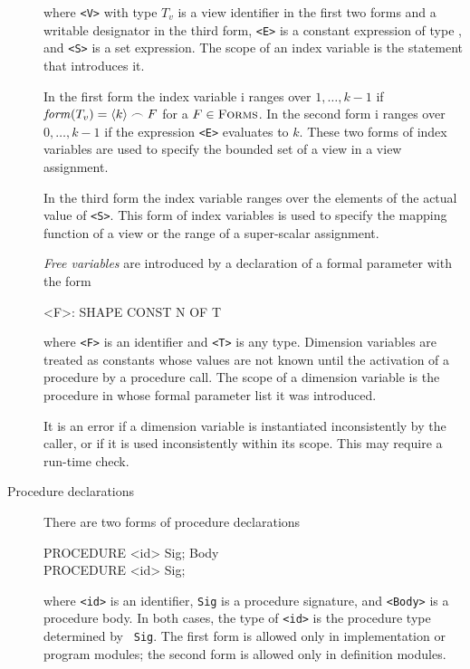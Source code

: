 \begin{description}
\noindent where {\tt <V>} with type $T_v$ is a view identifier in the
first two forms and a writable designator in the third form, {\tt <E>}
is a constant expression of type , and {\tt <S>} is a set
expression. The scope of an index variable is the statement that
introduces it.

In the first form the index variable {\sf i} ranges over
$1,\ldots,k-1$ if $\mbox{\em form\/}(T_v) = \langle k \rangle \frown F$ for a $F
\in \mbox{\sc Forms\/}$. In the second form {\sf i} ranges over $0,\ldots,k-1$ if
the expression {\tt <E>} evaluates to $k$. These two forms of index
variables are used to specify the bounded set of a view in a view
assignment.

In the third form the index variable ranges over the elements of the
actual value of {\tt <S>}. This form of index variables is used to
specify the mapping function of a view or the range of a super-scalar
assignment. 

{\em Free variables} are introduced by a declaration of a formal
parameter with the form

\begin{frag}
<F>: SHAPE {CONST N} OF T
\end{frag}

\noindent where {\tt <F>} is an identifier and {\tt <T>} is any type.
Dimension variables are treated as constants whose values are not
known until the activation of a procedure by a procedure call. The
scope of a dimension variable is the procedure in whose formal
parameter list it was introduced.

It is an error if a dimension variable is instantiated inconsistently
by the caller, or if it is used inconsistently within its scope. This
may require a run-time check.

\item[Procedure declarations]

There are two forms of procedure declarations

\begin{frag}
PROCEDURE <id> Sig; Body\\
\hlf
[EXTERN] PROCEDURE <id> Sig;
\end{frag}

\noindent where {\tt <id>} is an identifier, {\tt Sig} is a
procedure signature, and {\tt <Body>} is a procedure body. In both
cases, the type of {\tt <id>} is the procedure type determined by {\tt
Sig}. The first form is allowed only in implementation or
program modules; the second form is allowed only in definition
modules. 


\end{description}
